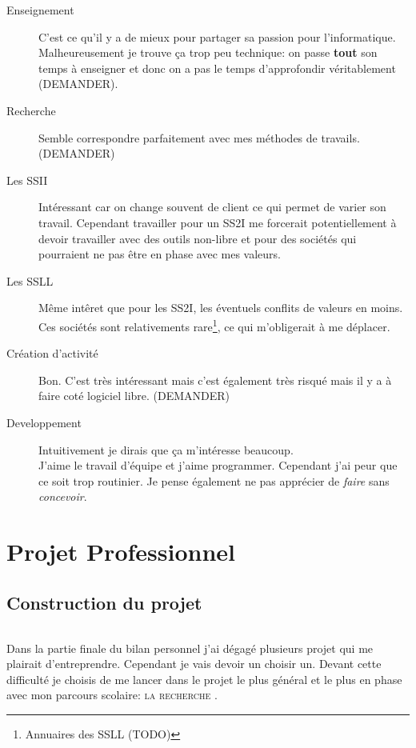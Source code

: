 \documentclass[a4paper,12pt, draft]{report}
\newcommand{\tabTitle}[1]{\hfill{} \textsc{#1} \hfill{} }
\begin{document}
\begin{description}
\item [Enseignement] C'est ce qu'il y a de mieux pour partager sa passion pour l'informatique. Malheureusement je trouve ça trop peu technique: on passe \textbf{tout} son temps à enseigner et donc on a pas le temps d'approfondir véritablement (DEMANDER).

\item [Recherche] Semble correspondre parfaitement avec mes méthodes de travails. (DEMANDER)

\item [Les SSII] Intéressant car on change souvent de client ce qui permet de varier son travail. Cependant travailler pour un SS2I me forcerait potentiellement à devoir travailler avec des outils non-libre et pour des sociétés qui pourraient ne pas être en phase avec mes valeurs.

\item [Les SSLL] Même intêret que pour les SS2I, les éventuels conflits de valeurs en moins. Ces sociétés sont relativements rare\footnote{Annuaires des SSLL (TODO)}, ce qui m'obligerait à me déplacer.
 
\item [Création d'activité] Bon. C'est très intéressant mais c'est également très risqué mais il y a à faire coté logiciel libre. (DEMANDER)

\item [Developpement] Intuitivement je dirais que ça m'intéresse beaucoup. \\J'aime le travail d'équipe et j'aime programmer. Cependant j'ai peur que ce soit trop routinier. Je pense également ne pas apprécier de \textit{faire} sans \textit{concevoir}.
\end{description}


\part{Projet Professionnel}

\chapter{Construction du projet}
\paragraph{}
Dans la partie finale du bilan personnel j'ai dégagé plusieurs projet qui me plairait d'entreprendre. Cependant je vais devoir un choisir un. Devant cette difficulté je choisis de me lancer dans le projet le plus général et le plus en phase avec mon parcours scolaire: \tabTitle{la recherche}. \\
\end{document}
